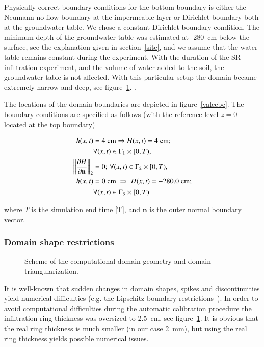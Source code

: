 \documentclass[review,times,3p,10pt]{elsarticle}
\newenvironment{lineq}
    {\begin{linenomath*}
    \begin{equation}
    }
    { 
    \end{equation} 
    \end{linenomath*}
    }
\renewcommand{\vec}{\mathbf}
\begin{document}
{Physically correct boundary conditions for the bottom boundary is either the Neumann no-flow boundary at the impermeable layer or Dirichlet boundary both at the groundwater table. We chose a constant Dirichlet boundary condition. {The minimum depth} of the groundwater table was estimated at -280~cm below the surface, {see the explanation given in section~\ref{site},} and  we assume that the water table remains constant during the experiment. With the duration of the SR infiltration experiment, and the volume of water added to the soil, the groundwater table is not affected. With this particular setup the domain became extremely narrow and deep, see figure~\ref{valec}. . 







The locations of the domain boundaries are depicted in figure~\ref{valecbc}. The boundary conditions are specified as follows (with the reference level $z=0$ located at the top boundary)
{\begin{lineq} 
\label{bccond}
\begin{split}
h(x,t) &= 4 \; \mbox{cm} \Rightarrow H(x,t) = 4 \; \mbox{cm}; \\ &\forall (x,t) \in \Gamma_1 \times [0,T), \\
\norm{\frac{\partial H}{\partial \vec{n}}}_2 &= 0; \, \forall (x,t) \in \Gamma_2 \times [0,T), \\
h(x,t) &= 0  \; \mbox{cm}  \; \Rightarrow \; H(x,t) = -280.0  \; \mbox{cm}; \\ &\forall (x,t) \in \Gamma_3 \times [0,T).
\end{split}
\end{lineq}}
where $T$ is the simulation end time [T], and $\vec{n}$ is the outer normal boundary vector.

\subsubsection{Domain shape restrictions}
\label{shaperestr}

 \begin{figure}
\centering
{}
 \caption{Scheme of the computational domain geometry and domain triangularization.}
 \label{valec}
\end{figure}


It is well-known that sudden changes in domain shapes, spikes and discontinuities yield numerical difficulties (e.g. the Lipschitz boundary restrictions~\citep{braess}).
In order to avoid computational difficulties during the automatic calibration procedure the infiltration ring thickness was oversized  to 2.5~cm, see figure~\ref{valec}. It is obvious that the real ring thickness is much smaller (in our case 2~mm), but using the real ring thickness yields possible numerical issues. 

}
\end{document}
